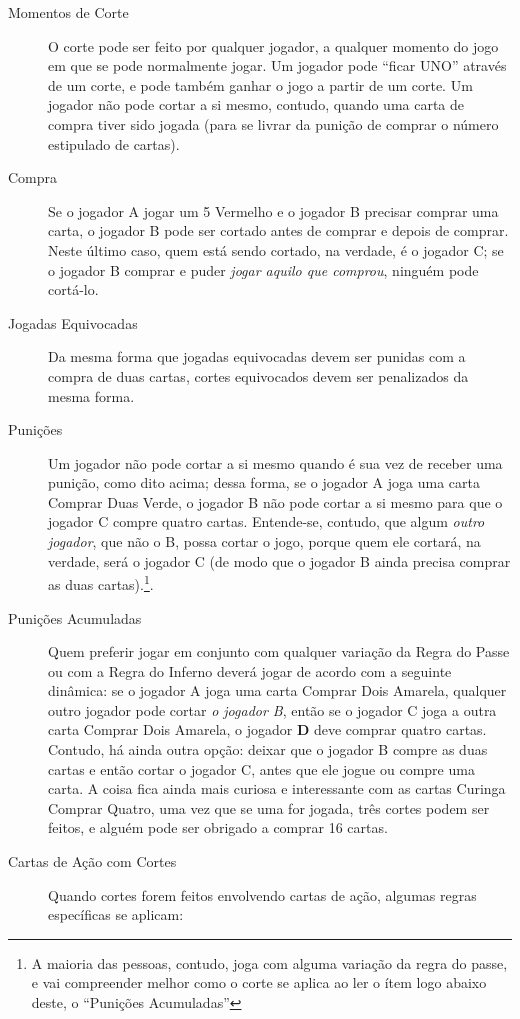 \begin{description}
\item[Momentos de Corte]{O corte pode ser feito por qualquer jogador, a qualquer momento do jogo em que se pode normalmente jogar. Um jogador pode ``ficar UNO'' através de um corte, e pode também ganhar o jogo a partir de um corte. Um jogador não pode cortar a si mesmo, contudo, quando uma carta de compra tiver sido jogada (para se livrar da punição de comprar o número estipulado de cartas).}
\item[Compra]{Se o jogador A jogar um 5 Vermelho e o jogador B precisar comprar uma carta, o jogador B pode ser cortado antes de comprar e depois de comprar. Neste último caso, quem está sendo cortado, na verdade, é o jogador C; se o jogador B comprar e puder \emph{jogar aquilo que comprou}, ninguém pode cortá-lo.}
\item[Jogadas Equivocadas]{Da mesma forma que jogadas equivocadas devem ser punidas com a compra de duas cartas, cortes equivocados devem ser penalizados da mesma forma.}
\item[Punições]{Um jogador não pode cortar a si mesmo quando é sua vez de receber uma punição, como dito acima; dessa forma, se o jogador A joga uma carta Comprar Duas Verde, o jogador B não pode cortar a si mesmo para que o jogador C compre quatro cartas. Entende-se, contudo, que algum \emph{outro jogador}, que não o B, possa cortar o jogo, porque quem ele cortará, na verdade, será o jogador C (de modo que o jogador B ainda precisa comprar as duas cartas).\footnote{A maioria das pessoas, contudo, joga com alguma variação da regra do passe, e vai compreender melhor como o corte se aplica ao ler o ítem logo abaixo deste, o ``Punições Acumuladas''}.}
\item[Punições Acumuladas]{Quem preferir jogar em conjunto com qualquer variação da Regra do Passe ou com a Regra do Inferno deverá jogar de acordo com a seguinte dinâmica: se o jogador A joga uma carta Comprar Dois Amarela, qualquer outro jogador pode cortar \emph{o jogador B}, então se o jogador C joga a outra carta Comprar Dois Amarela, o jogador \textbf{D} deve comprar quatro cartas. Contudo, há ainda outra opção: deixar que o jogador B compre as duas cartas e então cortar o jogador C, antes que ele jogue ou compre uma carta. A coisa fica ainda mais curiosa e interessante com as cartas Curinga Comprar Quatro, uma vez que se uma for jogada, três cortes podem ser feitos, e alguém pode ser obrigado a comprar 16 cartas.}
\item[Cartas de Ação com Cortes]{Quando cortes forem feitos envolvendo cartas de ação, algumas regras específicas se aplicam:
}
\end{description}
